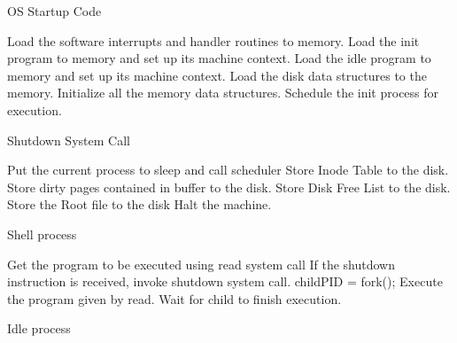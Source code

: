 \begin{algorithm}
\caption{OS Startup Code}
\begin{algorithmic}
\STATE Load the software interrupts and handler routines to memory.
\STATE Load the init program to memory and set up its machine context.
\STATE Load the idle program to memory and set up its machine context.
\STATE Load the disk data structures to the memory.
\STATE Initialize all the memory data structures.
\STATE Schedule the init process for execution.
\end{algorithmic}
\end{algorithm}


\begin{algorithm}
\caption{Shutdown System Call}
\begin{algorithmic}
    \STATE Put the current process to sleep and call scheduler
\ENDWHILE
\STATE Store Inode Table to the disk.
\STATE Store dirty pages contained in buffer to the disk.     
\STATE Store Disk Free List to the disk.
\STATE Store the Root file to the disk
\STATE Halt the machine.
\end{algorithmic}
\end{algorithm}


\begin{algorithm}
\caption{Shell process}
\begin{algorithmic}
    \STATE Get the program to be executed using read system call
    \STATE If the shutdown instruction is received, invoke shutdown system call.
    \STATE childPID = fork();
        \STATE Execute the program given by read.
    \ELSE 
        \STATE Wait for child to finish execution.
    \ENDIF
\ENDWHILE

\end{algorithmic}
\end{algorithm}


\begin{algorithm}
\caption{Idle process}
\begin{algorithmic}
\ENDWHILE
\end{algorithmic}
\end{algorithm}
